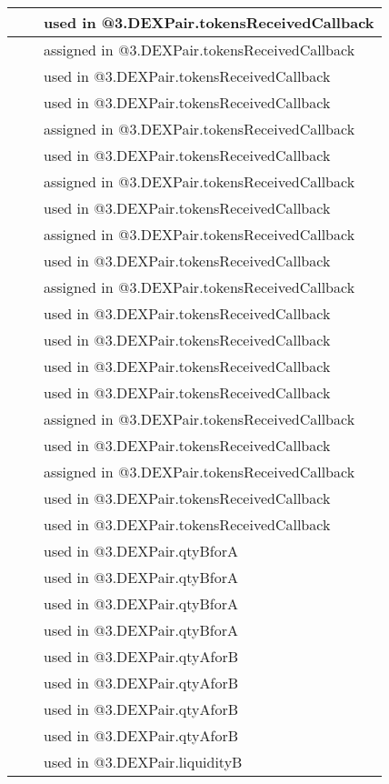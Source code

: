 \begin{tabular}{|l|l|p{5cm}|}
 & & used in @3.DEXPair.tokensReceivedCallback\\\hline
 & & assigned in @3.DEXPair.tokensReceivedCallback\\\hline
 & & used in @3.DEXPair.tokensReceivedCallback\\\hline
 & & used in @3.DEXPair.tokensReceivedCallback\\\hline
 & & assigned in @3.DEXPair.tokensReceivedCallback\\\hline
 & & used in @3.DEXPair.tokensReceivedCallback\\\hline
 & & assigned in @3.DEXPair.tokensReceivedCallback\\\hline
 & & used in @3.DEXPair.tokensReceivedCallback\\\hline
 & & assigned in @3.DEXPair.tokensReceivedCallback\\\hline
 & & used in @3.DEXPair.tokensReceivedCallback\\\hline
 & & assigned in @3.DEXPair.tokensReceivedCallback\\\hline
 & & used in @3.DEXPair.tokensReceivedCallback\\\hline
 & & used in @3.DEXPair.tokensReceivedCallback\\\hline
 & & used in @3.DEXPair.tokensReceivedCallback\\\hline
 & & used in @3.DEXPair.tokensReceivedCallback\\\hline
 & & assigned in @3.DEXPair.tokensReceivedCallback\\\hline
 & & used in @3.DEXPair.tokensReceivedCallback\\\hline
 & & assigned in @3.DEXPair.tokensReceivedCallback\\\hline
 & & used in @3.DEXPair.tokensReceivedCallback\\\hline
 & & used in @3.DEXPair.tokensReceivedCallback\\\hline
 & & used in @3.DEXPair.qtyBforA\\\hline
 & & used in @3.DEXPair.qtyBforA\\\hline
 & & used in @3.DEXPair.qtyBforA\\\hline
 & & used in @3.DEXPair.qtyBforA\\\hline
 & & used in @3.DEXPair.qtyAforB\\\hline
 & & used in @3.DEXPair.qtyAforB\\\hline
 & & used in @3.DEXPair.qtyAforB\\\hline
 & & used in @3.DEXPair.qtyAforB\\\hline
 & & used in @3.DEXPair.liquidityB\\\hline

\end{tabular}
